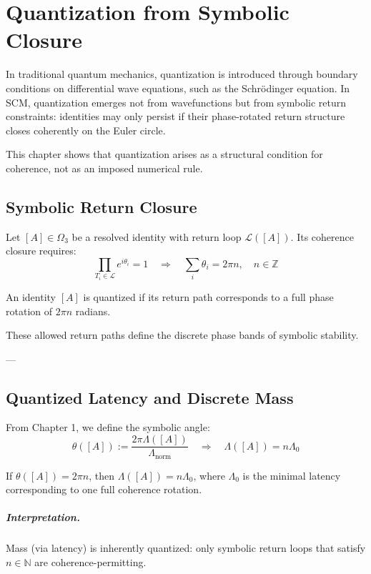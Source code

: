 \chapter{Quantization from Symbolic Closure} \label{chapter:quantization}

In traditional quantum mechanics, quantization is introduced through boundary conditions on differential wave equations, such as the Schrödinger equation. In SCM, quantization emerges not from wavefunctions but from symbolic return constraints: identities may only persist if their phase-rotated return structure closes coherently on the Euler circle.

This chapter shows that quantization arises as a structural condition for coherence, not as an imposed numerical rule.

\section{Symbolic Return Closure}

Let $[A] \in \Omega_3$ be a resolved identity with return loop $\mathcal{L}([A])$. Its coherence closure requires:
\[
\prod_{T_i \in \mathcal{L}} e^{i\theta_i} = 1 \quad \Rightarrow \quad \sum_i \theta_i = 2\pi n,\quad n \in \mathbb{Z}
\]

\begin{definition}
An identity $[A]$ is quantized if its return path corresponds to a full phase rotation of $2\pi n$ radians.
\end{definition}

These allowed return paths define the discrete phase bands of symbolic stability.

---

\section{Quantized Latency and Discrete Mass}

From Chapter 1, we define the symbolic angle:
\[
\theta([A]) := \frac{2\pi \Lambda([A])}{\Lambda_{\text{norm}}}
\quad \Rightarrow \quad \Lambda([A]) = n \Lambda_0
\]

\begin{proposition}
If $\theta([A]) = 2\pi n$, then $\Lambda([A]) = n \Lambda_0$, where $\Lambda_0$ is the minimal latency corresponding to one full coherence rotation.
\end{proposition}

\paragraph{Interpretation.}  
Mass (via latency) is inherently quantized: only symbolic return loops that satisfy $n \in \mathbb{N}$ are coherence-permitting.


